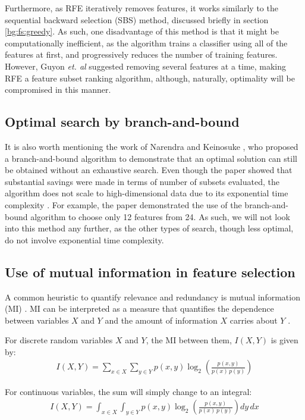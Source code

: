 \documentclass[12pt, twoside, a4paper]{report}
\begin{document}
Furthermore, as RFE iteratively removes features, it works similarly to the sequential backward selection (SBS) method, discussed briefly in section \ref{bg:fs:greedy}. As such, one disadvantage of this method is that it might be computationally inefficient, as the algorithm trains a classifier using all of the features at first, and progressively reduces the number of training features. However, Guyon \textit{et. al} suggested removing several features at a time, making RFE a feature subset ranking algorithm, although, naturally, optimality will be compromised in this manner.


\subsection{Optimal search by branch-and-bound}
It is also worth mentioning the work of Narendra and Keinosuke \cite{RefWorks:176}, who proposed a branch-and-bound algorithm to demonstrate that an optimal solution can still be obtained without an exhaustive search. Even though the paper showed that substantial savings were made in terms of number of subsets evaluated, the algorithm does not scale to high-dimensional data \cite{RefWorks:178} due to its exponential time complexity \cite{RefWorks:190, RefWorks:189}. For example, the paper demonstrated the use of the branch-and-bound algorithm to choose only 12 features from 24. As such, we will not look into this method any further, as the other types of search, though less optimal, do not involve exponential time complexity.

\subsection{Use of mutual information in feature selection} \label{bg:fs:mi}

A common heuristic to quantify relevance and redundancy is mutual information (MI) \cite{RefWorks:98}. MI can be interpreted as a measure that quantifies the dependence between variables $X$ and $Y$ \cite{RefWorks:180} and the amount of information $X$ carries about $Y$ \cite{RefWorks:181}. 

For discrete random variables $X$ and $Y$, the MI between them, $I(X, Y)$ is given by:
\begin{align} \label{bg:fs:mi:dis}
I(X, Y) = \sum_{x \in X} \sum_{y \in Y} p(x, y) \log_2 \left(\frac{p(x, y)}{p(x) \, p(y)} \right) 
\end{align}

For continuous variables, the sum will simply change to an integral:
\begin{align} \label{bg:fs:mi:cont}
I(X, Y) = \int_{x \in X} \int_{y \in Y} p(x, y) \log_2 \left( \frac{p(x, y)}{p(x) \, p(y)} \right) dy \, dx
\end{align}
\end{document}
